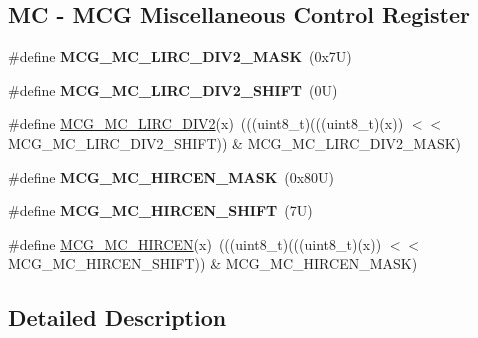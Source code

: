 \subsection*{MC -\/ M\+CG Miscellaneous Control Register}
\begin{DoxyCompactItemize}
\item 
\mbox{\label{group___m_c_g___register___masks_ga0757b2819fd3cb5b0f84a0f0db4689ec}} 
\#define {\bfseries M\+C\+G\+\_\+\+M\+C\+\_\+\+L\+I\+R\+C\+\_\+\+D\+I\+V2\+\_\+\+M\+A\+SK}~(0x7\+U)
\item 
\mbox{\label{group___m_c_g___register___masks_gaf0f3a8da107da3d73e64533d1418a801}} 
\#define {\bfseries M\+C\+G\+\_\+\+M\+C\+\_\+\+L\+I\+R\+C\+\_\+\+D\+I\+V2\+\_\+\+S\+H\+I\+FT}~(0\+U)
\item 
\#define \mbox{\hyperlink{group___m_c_g___register___masks_ga4eaf522856abc1772db3573d745be4a5}{M\+C\+G\+\_\+\+M\+C\+\_\+\+L\+I\+R\+C\+\_\+\+D\+I\+V2}}(x)~(((uint8\+\_\+t)(((uint8\+\_\+t)(x)) $<$$<$ M\+C\+G\+\_\+\+M\+C\+\_\+\+L\+I\+R\+C\+\_\+\+D\+I\+V2\+\_\+\+S\+H\+I\+FT)) \& M\+C\+G\+\_\+\+M\+C\+\_\+\+L\+I\+R\+C\+\_\+\+D\+I\+V2\+\_\+\+M\+A\+SK)
\item 
\mbox{\label{group___m_c_g___register___masks_gaf6dfe20b515e7259cbc8c883768f63f2}} 
\#define {\bfseries M\+C\+G\+\_\+\+M\+C\+\_\+\+H\+I\+R\+C\+E\+N\+\_\+\+M\+A\+SK}~(0x80\+U)
\item 
\mbox{\label{group___m_c_g___register___masks_ga71c9fc83b7ae84f6db0290dc3abaaca0}} 
\#define {\bfseries M\+C\+G\+\_\+\+M\+C\+\_\+\+H\+I\+R\+C\+E\+N\+\_\+\+S\+H\+I\+FT}~(7\+U)
\item 
\#define \mbox{\hyperlink{group___m_c_g___register___masks_gaab62005914b173a041ba0c853126b854}{M\+C\+G\+\_\+\+M\+C\+\_\+\+H\+I\+R\+C\+EN}}(x)~(((uint8\+\_\+t)(((uint8\+\_\+t)(x)) $<$$<$ M\+C\+G\+\_\+\+M\+C\+\_\+\+H\+I\+R\+C\+E\+N\+\_\+\+S\+H\+I\+FT)) \& M\+C\+G\+\_\+\+M\+C\+\_\+\+H\+I\+R\+C\+E\+N\+\_\+\+M\+A\+SK)
\end{DoxyCompactItemize}


\subsection{Detailed Description}


